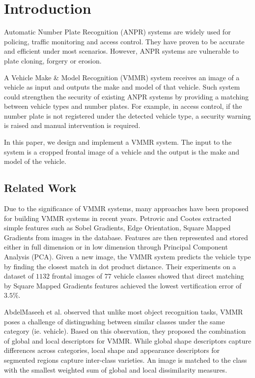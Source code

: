 \chapter{Introduction}
\label{chap:introduction}

Automatic Number Plate Recognition (ANPR) systems are widely used for policing, traffic monitoring and access control.
They have proven to be accurate and efficient under most scenarios.
However, ANPR systems are vulnerable to plate cloning, forgery or erosion.


A Vehicle Make \& Model Recognition (VMMR) system receives an image of a vehicle as input and outputs the make and model of that vehicle.
Such system could strengthen the security of existing ANPR systems by providing a matching between vehicle types and number plates.
For example, in access control, if the number plate is not registered under the detected vehicle type, a security warning is raised and manual intervention is required.

In this paper, we design and implement a VMMR system. The input to the system is a cropped frontal image of a vehicle and the output is the make and model of the vehicle.




\section{Related Work}

Due to the significance of VMMR systems, many approaches have been proposed for building VMMR systems in recent years. 
Petrovic and Cootes \citep{petrovic2004analysis} extracted simple features such as Sobel Gradients, Edge Orientation, Square Mapped Gradients from images in the database. 
Features are then represented and stored either in full dimension or in low dimension through Principal Component Analysis (PCA).
Given a new image, the VMMR system predicts the vehicle type by finding the closest match in dot product distance.
Their experiments on a dataset of $1132$ frontal images of $77$ vehicle classes showed that direct matching by Square Mapped Gradients features achieved the lowest vertification error of $3.5\%$.

AbdelMaseeh et al. \citep{abdelmaseeh2012car} observed that unlike most object recognition tasks, VMMR poses a challenge of distingushing between similar classes under the same category (ie. vehicle).
Based on this observation, they proposed the combination of global and local descriptors for VMMR.
While global shape descriptors capture differences across categories, local shape and appearance descriptors for segmented regions capture inter-class varieties.
An image is matched to the class with the smallest weighted sum of global and local dissimilarity measures.


